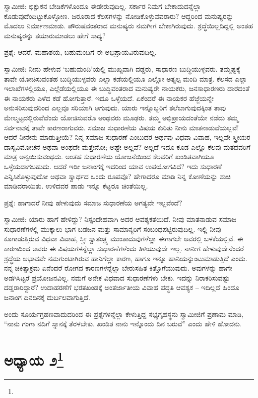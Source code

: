 ಸ್ವಾಮೀಜಿ: ಭಿಕ್ಷುಕನ ಬೇಡಿಕೆಗಳೊಂದೂ ಈಡೇರುವುದಿಲ್ಲ. ಸರ್ಕಾರ ನಿಮಗೆ ಬೇಕಾದುದನ್ನೆಲ್ಲಾ ಕೊಡುವುದೆಂದಿಟ್ಟುಕೊಳ್ಳೋಣ. ಜರೂರಾದ ಕೆಲಸಗಳನ್ನು ನೋಡಿಕೊಳ್ಳುವವರಾರು? ಆದ್ದರಿಂದ ಮನುಷ್ಯರನ್ನು ಮೊದಲು ನಿರ್ಮಾಣಮಾಡು. ಪೌರುಷವಂತರಾದ ಮನುಷ್ಯರು ನಮಗೀಗ ಬೇಕಾಗಿರುವುದು. ಶ್ರದ್ಧೆಯಿಲ್ಲದಿದ್ದಲ್ಲಿ ಅಂತಹ ಮನುಷ್ಯರನ್ನು ತಯಾರುಮಾಡಲು ಹೇಗೆ ಸಾಧ್ಯ?

ಪ್ರಶ್ನೆ: ಆದರೆ, ಮಹಾಶಯ, ಬಹುಮಂದಿಗೆ ಈ ಅಭಿಪ್ರಾಯವಿರುವುದಿಲ್ಲ.

ಸ್ವಾಮೀಜಿ: ನೀನು ಹೇಳುವ ‘ಬಹುಮಂದಿ’ಯಲ್ಲಿ ಮುಖ್ಯವಾಗಿ ದಡ್ಡರು, ಸಾಧಾರಣ ಬುದ್ಧಿಯುಳ್ಳವರು. ತಮ್ಮಷ್ಟಕ್ಕೆ ತಾವೇ ಯೋಚಿಸುವಂತಹ ಬುದ್ಧಿಯುಳ್ಳವರು ಎಲ್ಲಾ ಕಡೆಯಲ್ಲಿಯೂ ಎಲ್ಲೋ ಅತ್ಯಲ್ಪ ಮಂದಿ ಮಾತ್ರ. ಕೆಲಸದ ಎಲ್ಲಾ ಇಲಾಖೆಗಳಲ್ಲಿಯೂ, ಎಲ್ಲೆಡೆಯಲ್ಲಿಯೂ ಈ ಬುದ್ಧಿವಂತರಾದ ಮನುಷ್ಯರೇ ನಾಯಕರು, ಜನಸಾಧಾರಣರು ದಾರದಂತೆ ಈ ನಾಯಕರು ಎಳೆದ ಕಡೆ ಹೋಗುತ್ತಾರೆ. ಇದೂ ಒಳ್ಳೆಯದೆ. ಏಕೆಂದರೆ ಈ ನಾಯಕರ ಹೆಜ್ಜೆಯನ್ನೇ ಅನುಸರಿಸುವುದರಿಂದ ಎಲ್ಲವೂ ಸರಿಯಾಗಿ ಆಗುವುದು. ಯಾರು ಇನ್ನೊಬ್ಬರಿಗೆ ತಲೆಬಾಗುವುದಕ್ಕಿಂತ ತಾವು ಮೇಲ್ಮಟ್ಟದಲ್ಲಿರುವೆವೆಂದು ಯೋಚಿಸುವರೊ ಅಂಥವರು ಮೂಢರು. ತಮ್ಮ ಅಭಿಪ್ರಾಯದಂತೆಯೇ ನಡೆದು ತಮ್ಮ ಸರ್ವನಾಶಕ್ಕೆ ತಾವೇ ಕಾರಣರಾಗುವರು. ಸಮಾಜ ಸುಧಾರಣೆಯ ವಿಷಯ ಕುರಿತು ನೀನು ಮಾತನಾಡುವೆಯಲ್ಲವೆ! ಆದರೆ ನೀನೇನು ಮಾಡುತ್ತೀಯೆ? ನಿನ್ನ ಸಮಾಜ ಸುಧಾರಣೆ ಎಂಬುದರ ಅರ್ಥವು ವಿಧವಾ ವಿವಾಹ, ಇಲ್ಲವೇ ಸ್ತ್ರೀಯರ ದಾಸ್ಯವಿಮೋಚನೆ ಅಥವಾ ಅಂಥದೇ ಮತ್ತೇನೋ; ಅಷ್ಟೇ ಅಲ್ಲವೆ? ಅಲ್ಲದೆ ಇದೂ ಕೂಡ ಎಲ್ಲೊ ಕೆಲವು ಮತದವರಿಗೆ ಮಾತ್ರ ಅನ್ವಯಿಸುವಂಥದು. ಅಂತಹ ಸುಧಾರಣೆಯ ಯೋಜನೆಯಿಂದ ಕೆಲವರಿಗೆ ಖಂಡಿತವಾಗಿಯೂ ಒಳ್ಳೆಯದಾಗಬಹುದು. ಆದರೆ ಇಡೀ ಜನಾಂಗಕ್ಕೆ ಇದರಿಂದ ಯಾವ ಉಪಯೋಗವಿದೆ? ಇದು ಸುಧಾರಣೆ ಎನ್ನಿಸಿಕೊಳ್ಳುವುದೋ ಅಥವಾ ಸ್ವಾರ್ಥದ ಒಂದು ರೂಪವೊ? ಹೇಗಾದರೂ ಮಾಡಿ ನಿನ್ನ ಕೋಣೆಯನ್ನು ಶುಚಿ ಮಾಡಿದರಾಯಿತು. ಉಳಿದವರ ಪಾಡು ಇನ್ನೂ ಕೆಟ್ಟರೂ ಚಿಂತೆಯಿಲ್ಲ.

ಪ್ರಶ್ನೆ: ಹಾಗಾದರೆ ನೀವು ಹೇಳುವುದು ಸಮಾಜ ಸುಧಾರಣೆಯ ಅಗತ್ಯವೇ ಇಲ್ಲವೆಂದೆ?

ಸ್ವಾಮೀಜಿ: ಯಾರು ಹಾಗೆ ಹೇಳಿದ್ದು? ನಿಸ್ಸಂದೇಹವಾಗಿ ಅದರ ಆವಶ್ಯಕತೆಯಿದೆ. ನೀವು ಮಾತನಾಡುವ ಸಮಾಜ ಸುಧಾರಣೆಗಳಲ್ಲಿ ಮುಕ್ಕಾಲು ಭಾಗ ಬಡಜನ ಮತ್ತು ಸಾಮಾನ್ಯರಿಗೆ ಸಂಬಂಧಪಟ್ಟಿರುವುದಿಲ್ಲ. ಇಲ್ಲಿ ನೀವು ಕೂಗಾಡುತ್ತಿರುವ ವಿಧವಾ ವಿವಾಹ, ಸ್ತ್ರೀ ಸ್ವಾತಂತ್ರ್ಯ ಮುಂತಾದುವುಗಳೆಲ್ಲಾ ಈಗಾಗಲೇ ಅವರಲ್ಲಿ ಬಳಕೆಯಲ್ಲಿವೆ. ಈ ಕಾರಣದಿಂದ ಅವರು ಈ ವಿಷಯಗಳನ್ನೆಲ್ಲಾ ಸುಧಾರಣೆಗಳೆಂದು ತಿಳಿಯುವುದೇ ಇಲ್ಲ. ನಾನೀಗ ಹೇಳುವುದೇನೆಂದರೆ ಶ್ರದ್ಧೆಯ ಅಭಾವವೇ ನಮಗುಂಟಾಗಿರುವ ಹಾನಿಗೆಲ್ಲಾ ಕಾರಣ, ಹಾಗೂ ಇನ್ನೂ ಹಾನಿಯನ್ನುಂಟುಮಾಡುತ್ತಿದೆ ಎಂದು. ನನ್ನ ಚಿಕಿತ್ಸಾಕ್ರಮ ಏನೆಂದರೆ ರೋಗದ ಕಾರಣಗಳನ್ನೆಲ್ಲಾ ಬೇರುಸಹಿತ ಕಿತ್ತೊಗೆಯುವುದು. ಅವುಗಳನ್ನು ಹಾಗೇ ಅಡಗಿಸಿಟ್ಟರೆ ಪ್ರಯೋಜನವಿಲ್ಲ. ನಮಗೆ ಅನೇಕ ವಿಧವಾದ ಸುಧಾರಣೆಗಳು ಬೇಕು. ಇದನ್ನು ನಿರಾಕರಿಸುವಷ್ಟು ದಡ್ಡರಾರಿದ್ದಾರೆ? ಉದಾಹರಣೆಗೆ ಭರತಖಂಡಕ್ಕೆ ಅಂತರ್ಜಾತೀಯ ವಿವಾಹ ಪದ್ಧತಿ ಆವಶ್ಯಕ – ಇದಿಲ್ಲದೆ ಹಿಂದೂ ಜನಾಂಗ ದಿನದಿನಕ್ಕೆ ದುರ್ಬಲವಾಗುತ್ತಿದೆ.

ಅಂದು ಸೂರ್ಯಗ್ರಹಣವಾದುದರಿಂದ ಈ ಪ್ರಶ್ನೆಗಳನ್ನೆಲ್ಲಾ ಕೇಳುತ್ತಿದ್ದ ಸಭ್ಯಗೃಹಸ್ಥನು ಸ್ವಾಮೀಜಿಗೆ ಪ್ರಣಾಮ ಮಾಡಿ, “ನಾನು ಗಂಗಾ ನದಿಗೆ ಸ್ನಾನಕ್ಕೆ ತೆರಳಬೇಕು. ಖಂಡಿತ ನಾನು ಇನ್ನೊಂದು ದಿನ ಬರುವೆ” ಎಂದು ಹೇಳಿ ಹೋದನು.

\newpage

\chapter[ಅಧ್ಯಾಯ ೨]{ಅಧ್ಯಾಯ ೨\protect\footnote{}}


